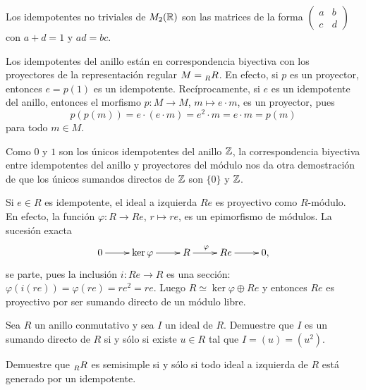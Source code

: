 \begin{example}
Los idempotentes no triviales de $M_2(\mathbb{R})$ son las matrices 
de la forma $\begin{pmatrix}a&b\\c&d\end{pmatrix}$ con $a+d=1$ y $ad=bc$.  	
\end{example}

Los idempotentes del anillo están en correspondencia biyectiva con los proyectores
de la representación regular $M=\prescript{}{R}R$. En efecto, si $p$ es un proyector, entonces $e=p(1)$ es un idempotente. Recíprocamente, 
si $e$ es un idempotente del anillo, entonces el morfismo $p\colon M\to M$, $m\mapsto e\cdot m$, es un proyector, pues
\[
p(p(m))=e\cdot (e\cdot m)=e^2\cdot m=e\cdot m=p(m)
\]
para todo $m\in M$.

\begin{example}
Como $0$ y $1$ son los únicos idempotentes del anillo $\mathbb{Z}$, la correspondencia biyectiva entre
idempotentes del anillo y proyectores del módulo 
nos da otra demostración de que los únicos sumandos directos de $\mathbb{Z}$ son $\{0\}$ y $\mathbb{Z}$.
\end{example}

\begin{example}
Si $e\in R$ es idempotente, el ideal a izquierda $Re$ es proyectivo como $R$-módulo. En efecto, la función
$\varphi\colon R\to Re$, $r\mapsto re$, es un epimorfismo de módulos. La sucesión
exacta
\[
	\label{eq:exacta}	
		\xymatrix{
        0\ar[r]
        & \ker\varphi
        \ar[r]
        & R
        \ar[r]^\varphi
        & Re\ar[r]
        & 0,
        }
\]
se parte, pues la inclusión $i\colon Re\to R$ es una sección: $\varphi(i(re))=\varphi(re)=re^2=re$. Luego
$R\simeq\ker\varphi\oplus Re$ y entonces $Re$ es proyectivo por ser sumando directo de un módulo libre. 
\end{example}

\begin{exercise}
\label{xca:I^2}
Sea $R$ un anillo conmutativo y sea $I$ un ideal de $R$. Demuestre que $I$ es un sumando directo de $R$ si y sólo si
existe $u\in R$ tal que $I=(u)=(u^2)$. 	
\end{exercise}

\begin{exercise}
\label{xca:ss_idempotente}
Demuestre que $\prescript{}{R}R$ es semisimple si y sólo si todo ideal a izquierda de $R$ está generado por un idempotente.
\end{exercise}


